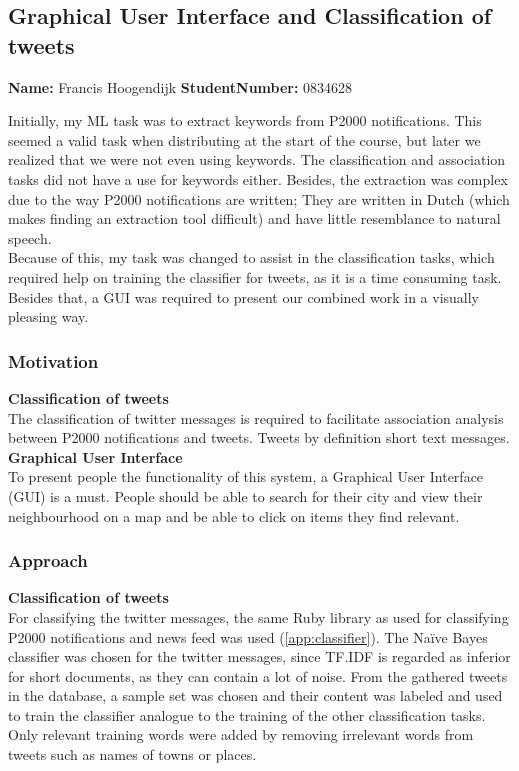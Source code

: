 \subsection{Graphical User Interface and Classification of tweets}
\textbf{Name:} Francis Hoogendijk  \indent \textbf{StudentNumber:} 0834628

Initially, my ML task was to extract keywords from P2000 notifications. This seemed a valid task when distributing at the start of the course, but later we realized that we were not even using keywords. The classification and association tasks did not have a use for keywords either. Besides, the extraction was complex due to the way P2000 notifications are written; They are written in Dutch (which makes finding an extraction tool difficult) and have little resemblance to natural speech. \\

Because of this, my task was changed to assist in the classification tasks, which required help on training the classifier for tweets, as it is a time consuming task. Besides that, a GUI was required to present our combined work in a visually pleasing way.

\subsubsection*{Motivation}
\textbf{Classification of tweets}\\
The classification of twitter messages is required to facilitate association analysis between P2000 notifications and tweets. Tweets by definition short text messages.\\

\textbf{Graphical User Interface}\\
To present people the functionality of this system, a Graphical User Interface (GUI) is a must. People should be able to search for their city and view their neighbourhood on a map and be able to click on items they find relevant. 
 
\subsubsection*{Approach}
\textbf{Classification of tweets}\\
For classifying the twitter messages, the same Ruby library as used for classifying P2000 notifications and news feed was used (\autoref{app:classifier}). The Na\"{i}ve Bayes classifier was chosen for the twitter messages, since TF.IDF is regarded as inferior for short documents, as they can contain a lot of noise. From the gathered tweets in the database, a sample set was chosen and their content was labeled and used to train the classifier analogue to the training of the other classification tasks. Only relevant training words were added by removing irrelevant words from tweets such as names of towns or places.\\

